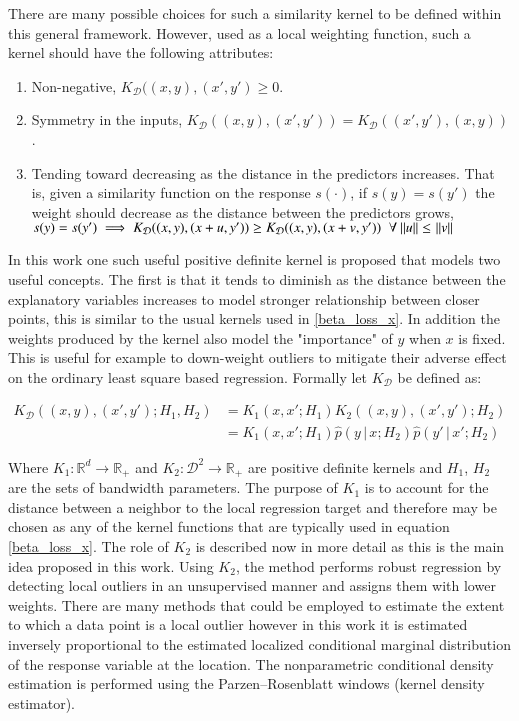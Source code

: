 \documentclass[preprint,1p,times]{elsarticle}
\begin{document}
There are many possible choices for such a similarity kernel to be defined within this general framework. However, used as a local weighting function, such a kernel should have the following attributes:
\begin{enumerate}
\item Non-negative, $K_{\mathcal{D}}((x,y) , ( x', y') \geq 0$.
\item Symmetry in the inputs, $K_{\mathcal{D}}((x,y) , ( x', y')) = K_{\mathcal{D}}((x', y') , (x,y))$.
\item Tending toward decreasing as the distance in the predictors increases. That is, given  a similarity function on the response $s(\cdot)$, if $s(y) = s(y')$ the weight should decrease as the distance between the predictors grows, $s(y) = s(y') \implies       
K_{\mathcal{D}}((x, y) , ( x + u, y')) \geq K_{\mathcal{D}}((x, y) , (x + v, y')) \; \; \forall \: \norm{u} \leq \: \norm{v}$
\end{enumerate}


In this work one such useful positive definite kernel is proposed that models two useful concepts. The first is that it tends to diminish as the distance between the explanatory variables increases to model stronger relationship between closer points, this is similar to the usual kernels used in \eqref{beta_loss_x}. In addition the weights produced by the kernel also model the "importance" of $y$ when $x$ is fixed. This is useful for example to down-weight outliers to mitigate their adverse effect on the ordinary least square based regression. Formally let $K_{\mathcal{D}}$ be defined as:

\begin{align}
K_{\mathcal{D}} \left((x,y),(x', y') ; H_1, H_2 \right) &= K_1(x,x' ; H_1) K_2 \left((x,y),(x', y') ; H_2 \right) \\
& = K_{1} (x,x';H_1) \hat{p}(y \, | \, x ; H_2) \hat{p}(y' \, | \, x'; H_2)
\label{compound_kernel_def}
\end{align}

Where $K_1: \mathbb{R}^d \rightarrow \mathbb{R}_+$ and $K_2: \mathcal{D}^2 \rightarrow \mathbb{R}_+$ are positive definite kernels and $H_1$, $H_2$ are the sets of bandwidth parameters. The purpose of $K_1$ is to account for the distance between a neighbor to the local regression target and therefore may be chosen as any of the kernel functions that are typically used in equation \eqref{beta_loss_x}. The role of $K_2$ is described now in more detail as this is the main idea proposed in this work. Using $K_2$, the method performs robust regression by detecting local outliers in an unsupervised manner and assigns them with lower weights. There are many methods that could be employed to estimate the extent to which a data point is a local outlier however in this work it is estimated inversely proportional to the estimated localized conditional marginal distribution of the response variable at the location. The nonparametric conditional density estimation is performed using the Parzen–Rosenblatt windows (kernel density estimator).
\end{document}
